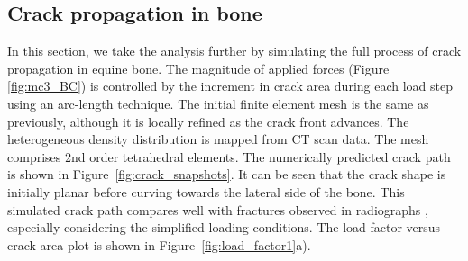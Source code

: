 \documentclass[onecolumn]{svjour3}
\begin{document}
\subsection{Crack propagation in bone}
In this section, we take the analysis further by simulating the full process of crack propagation in equine bone. 
The magnitude of applied forces (Figure \ref{fig:mc3_BC}) is controlled by the increment in crack area during each load step using an arc-length technique. 
The initial finite element mesh is the same as previously, although it is locally refined as the crack front advances. 
The heterogeneous density distribution is mapped from CT scan data. 
The mesh comprises 2nd order tetrahedral elements.
The numerically predicted crack path is shown in Figure~\ref{fig:crack_snapshots}. 
It can be seen that the crack shape is initially planar before curving towards the lateral side of the bone. This simulated crack path compares well with fractures observed in radiographs \cite{whitton2010third}, especially considering the simplified loading conditions. 
The load factor versus crack area plot is shown in Figure~\ref{fig:load_factor1}a). 
% 
\end{document}
